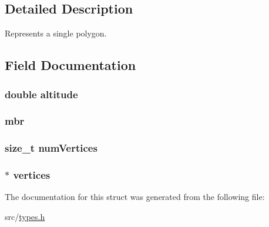\subsection{Detailed Description}
Represents a single polygon. 

\subsection{Field Documentation}
\subsubsection[{\texorpdfstring{altitude}{altitude}}]{\setlength{\rightskip}{0pt plus 5cm}double altitude}\hypertarget{struct_zone__general_a2b13d276aee0d9fd646c8fa3647e869b}{}\label{struct_zone__general_a2b13d276aee0d9fd646c8fa3647e869b}
\subsubsection[{\texorpdfstring{mbr}{mbr}}]{ mbr}\hypertarget{struct_zone__general_a5704de758d5631f53b2bb724b152f40b}{}\label{struct_zone__general_a5704de758d5631f53b2bb724b152f40b}
\subsubsection[{\texorpdfstring{num\+Vertices}{numVertices}}]{\setlength{\rightskip}{0pt plus 5cm}size\+\_\+t num\+Vertices}\hypertarget{struct_zone__general_a4201b99044782c4891e04f4981f402e9}{}\label{struct_zone__general_a4201b99044782c4891e04f4981f402e9}
\subsubsection[{\texorpdfstring{vertices}{vertices}}]{$\ast$ vertices}\hypertarget{struct_zone__general_acc847332c99d5cd8e044760a5c04fa1f}{}\label{struct_zone__general_acc847332c99d5cd8e044760a5c04fa1f}


The documentation for this struct was generated from the following file\+:\begin{DoxyCompactItemize}
\item 
src/\hyperlink{types_8h}{types.\+h}\end{DoxyCompactItemize}
